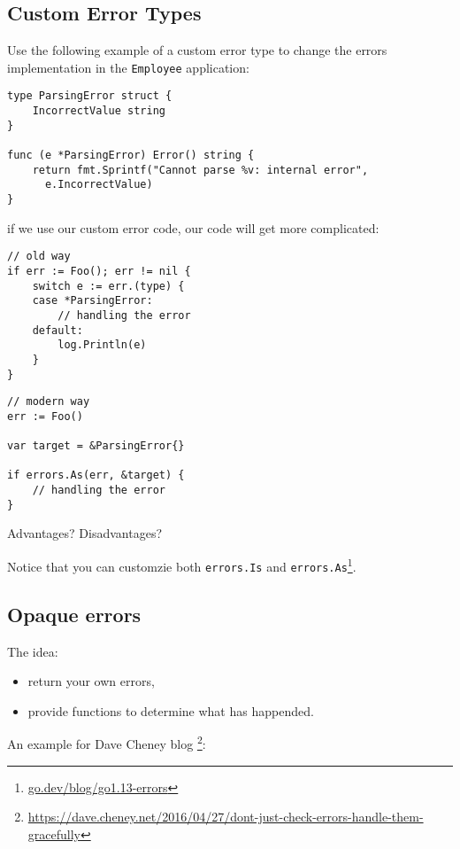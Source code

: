 \documentclass[11pt, letterpaper]{article}
\begin{document}
\subsection{Custom Error Types}

Use the following example of a custom error type to change the errors implementation in the \verb|Employee| application:

\begin{verbatim}
type ParsingError struct {
    IncorrectValue string
}

func (e *ParsingError) Error() string {
    return fmt.Sprintf("Cannot parse %v: internal error",
      e.IncorrectValue)
}
\end{verbatim}

if we use our custom error code, our code will get more complicated:

\begin{verbatim}
// old way
if err := Foo(); err != nil {
    switch e := err.(type) {
    case *ParsingError:
        // handling the error
    default:
        log.Println(e)
    }
}
\end{verbatim}

\begin{verbatim}
// modern way
err := Foo()

var target = &ParsingError{}

if errors.As(err, &target) {
	// handling the error
}
\end{verbatim}

Advantages? Disadvantages?
\bigskip

Notice that you can customzie both \texttt{errors.Is} and \texttt{errors.As}\footnote{\href{https://go.dev/blog/go1.13-errors}{go.dev/blog/go1.13-errors}}.

\subsection{Opaque errors}

The idea:

\begin{itemize}
\item return your own errors,
\item provide functions to determine what has happended.
\end{itemize}

An example for Dave Cheney blog \footnote{\href{https://dave.cheney.net/2016/04/27/dont-just-check-errors-handle-them-gracefully}{https://dave.cheney.net/2016/04/27/dont-just-check-errors-handle-them-gracefully}}:
\end{document}
